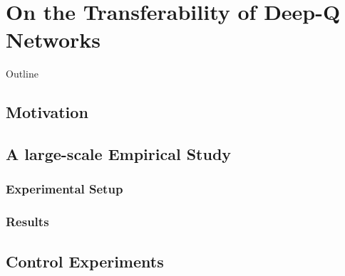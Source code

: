 
\chapter{On the Transferability of Deep-Q Networks} %
\label{ch:dqn_transfer} %

\begin{remark}{Outline}
\end{remark}


\section{Motivation}


\section{A large-scale Empirical Study}

\subsection{Experimental Setup}

\subsection{Results}


\section{Control Experiments}

